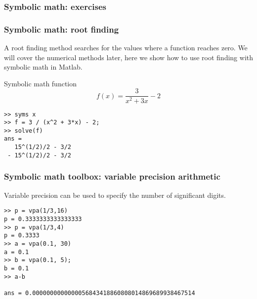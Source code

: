 \begin{frame}[fragile]
  \frametitle{Symbolic math: exercises}
  \pause
\end{frame}

\begin{frame}[fragile]
  \frametitle{Symbolic math: root finding }
  A root finding method searches for the values where a function reaches zero. We will cover the numerical methods later, here we show how to use root finding with symbolic math in Matlab.
   \begin{block}{Symbolic math function}
  \[ f(x) =   \frac{3}{x^2 + 3x} - 2 \]
  \pause
  \begin{lstlisting}
>> syms x
>> f = 3 / (x^2 + 3*x) - 2;
>> solve(f)
ans =
   15^(1/2)/2 - 3/2
 - 15^(1/2)/2 - 3/2
    \end{lstlisting}
   \end{block}
\end{frame}

\begin{frame}[fragile]
  \frametitle{Symbolic math toolbox: variable precision arithmetic}
  Variable precision can be used to specify the number of significant digits.
      \begin{lstlisting}
>> p = vpa(1/3,16)
p = 0.3333333333333333
>> p = vpa(1/3,4)
p = 0.3333
>> a = vpa(0.1, 30)
a = 0.1
>> b = vpa(0.1, 5);
b = 0.1
>> a-b
 
ans = 0.0000000000000056843418860808014869689938467514
\end{lstlisting}
\end{frame}

